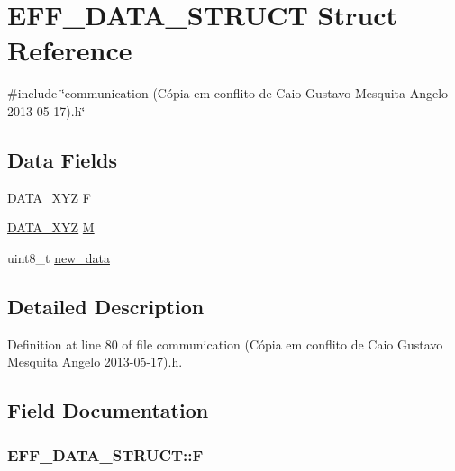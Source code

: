 \hypertarget{structEFF__DATA__STRUCT}{\section{E\-F\-F\-\_\-\-D\-A\-T\-A\-\_\-\-S\-T\-R\-U\-C\-T Struct Reference}
\label{structEFF__DATA__STRUCT}
}


{\ttfamily \#include \char`\"{}communication (\-Cópia em conflito de Caio Gustavo Mesquita Angelo 2013-\/05-\/17).\-h\char`\"{}}

\subsection*{Data Fields}
\begin{DoxyCompactItemize}
\item 
\hyperlink{structDATA__XYZ}{D\-A\-T\-A\-\_\-\-X\-Y\-Z} \hyperlink{structEFF__DATA__STRUCT_abe8952947b54bf9c247f3429ee3aeb44}{F}
\item 
\hyperlink{structDATA__XYZ}{D\-A\-T\-A\-\_\-\-X\-Y\-Z} \hyperlink{structEFF__DATA__STRUCT_aaf6e03b6e600295e0f5c706fc869e9d1}{M}
\item 
uint8\-\_\-t \hyperlink{structEFF__DATA__STRUCT_aa42ebc512dd79fa6ebf998162a149446}{new\-\_\-data}
\end{DoxyCompactItemize}


\subsection{Detailed Description}


Definition at line 80 of file communication (\-Cópia em conflito de Caio Gustavo Mesquita Angelo 2013-\/05-\/17).\-h.



\subsection{Field Documentation}
\hypertarget{structEFF__DATA__STRUCT_abe8952947b54bf9c247f3429ee3aeb44}{
\subsubsection[{F}]{ E\-F\-F\-\_\-\-D\-A\-T\-A\-\_\-\-S\-T\-R\-U\-C\-T\-::\-F}}\label{structEFF__DATA__STRUCT_abe8952947b54bf9c247f3429ee3aeb44}


